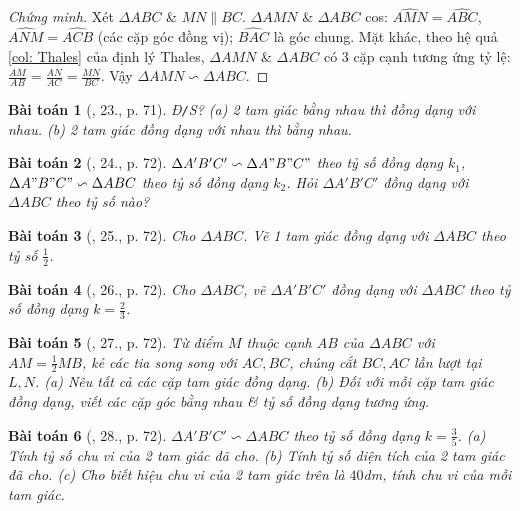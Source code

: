 \documentclass{article}
\newtheorem{baitoan}{Bài toán}
\begin{document}
\begin{proof}[Chứng minh]
	Xét $\Delta ABC$ \& $MN\parallel BC$. $\Delta AMN$ \& $\Delta ABC$ cos: $\widehat{AMN} = \widehat{ABC}$, $\widehat{ANM} = \widehat{ACB}$ (các cặp góc đồng vị); $\widehat{BAC}$ là góc chung. Mặt khác, theo hệ quả \ref{col: Thales} của định lý Thales, $\Delta AMN$ \& $\Delta ABC$ có 3 cặp cạnh tương ứng tỷ lệ: $\frac{AM}{AB} = \frac{AN}{AC} = \frac{MN}{BC}$. Vậy $\Delta AMN\backsim\Delta ABC$.
\end{proof}

\begin{baitoan}[\cite{SGK_Toan_8_tap_2}, 23., p. 71]
	\emph{Đ\texttt{/}S?} (a) 2 tam giác bằng nhau thì đồng dạng với nhau. (b) 2 tam giác đồng dạng với nhau thì bằng nhau.
\end{baitoan}

\begin{baitoan}[\cite{SGK_Toan_8_tap_2}, 24., p. 72]
	$\Delta A'B'C'\backsim\Delta A"B"C"$ theo tỷ số đồng dạng $k_1$, $\Delta A"B"C"\backsim\Delta ABC$ theo tỷ số đồng dạng $k_2$. Hỏi $\Delta A'B'C'$ đồng dạng với $\Delta ABC$ theo tỷ số nào?
\end{baitoan}

\begin{baitoan}[\cite{SGK_Toan_8_tap_2}, 25., p. 72]
	Cho $\Delta ABC$. Vẽ 1 tam giác đồng dạng với $\Delta ABC$ theo tỷ số $\frac{1}{2}$.
\end{baitoan}

\begin{baitoan}[\cite{SGK_Toan_8_tap_2}, 26., p. 72]
	Cho $\Delta ABC$, vẽ $\Delta A'B'C'$ đồng dạng với $\Delta ABC$ theo tỷ số đồng dạng $k = \frac{2}{3}$.
\end{baitoan}

\begin{baitoan}[\cite{SGK_Toan_8_tap_2}, 27., p. 72]
	Từ điểm $M$ thuộc cạnh $AB$ của $\Delta ABC$ với $AM = \frac{1}{2}MB$, kẻ các tia song song với $AC,BC$, chúng cắt $BC,AC$ lần lượt tại $L,N$. (a) Nêu tất cả các cặp tam giác đồng dạng. (b) Đối với mỗi cặp tam giác đồng dạng, viết các cặp góc bằng nhau \& tỷ số đồng dạng tương ứng.	
\end{baitoan}

\begin{baitoan}[\cite{SGK_Toan_8_tap_2}, 28., p. 72]
	$\Delta A'B'C'\backsim\Delta ABC$ theo tỷ số đồng dạng $k = \frac{3}{5}$. (a) Tính tỷ số chu vi của 2 tam giác đã cho. (b) Tính tỷ số diện tích của 2 tam giác đã cho. (c) Cho biết hiệu chu vi của 2 tam giác trên là $40$\emph{dm}, tính chu vi của mỗi tam giác.
\end{baitoan}
\end{document}
